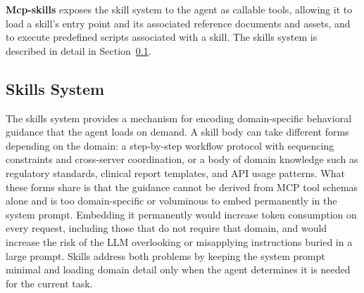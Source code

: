 \documentclass[conference]{IEEEtran}
\begin{document}
\textbf{Mcp-skills} exposes the skill system to the agent as callable
tools, allowing it to load a skill's entry point and its associated
reference documents and assets, and to execute predefined scripts
associated with a skill. The skills system is described in detail in
Section~\ref{sec:skills}.



\subsection{Skills System}
\label{sec:skills}

The skills system provides a mechanism for encoding domain-specific
behavioral guidance that the agent loads on demand. A skill body can
take different forms depending on the domain: a step-by-step workflow
protocol with sequencing constraints and cross-server coordination, or
a body of domain knowledge such as regulatory standards, clinical
report templates, and API usage patterns. What these forms share is
that the guidance cannot be derived from MCP tool schemas alone and is
too domain-specific or voluminous to embed permanently in the system
prompt.
Embedding it permanently would increase token consumption on
every request, including those that do not require that domain, and
would increase the risk of the LLM overlooking or misapplying
instructions buried in a large prompt. Skills address
both problems by keeping the system prompt minimal and loading domain
detail only when the agent determines it is needed for the current
task.
\end{document}
